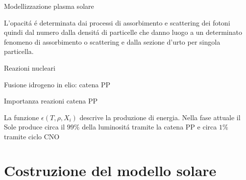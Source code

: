 \documentclass[10pt,xcolor={usenames},fleqn,mathserif,serif]{beamer}
\begin{document}
\begin{wordonframe}{Modellizzazione plasma solare}

L'opacit\'a \'e determinata dai processi di assorbimento e scattering dei fotoni quindi dal numero dalla densit\'a di particelle che danno luogo a un determinato fenomeno di assorbimento o scattering e dalla sezione d'urto per singola particella.

\end{wordonframe}


\begin{frame}{Reazioni nucleari}

\begin{block}{Fusione idrogeno in elio: catena PP}

\end{block}

\end{frame}

\begin{wordonframe}{Importanza reazioni catena PP}

La funzione $\epsilon(T,\rho,X_i)$ descrive la produzione di energia. Nella fase attuale il Sole produce circa il $99\%$ della luminosit\'a tramite la catena PP e circa $1\%$ tramite ciclo CNO

\end{wordonframe}


\section{Costruzione del modello solare}
\end{document}
